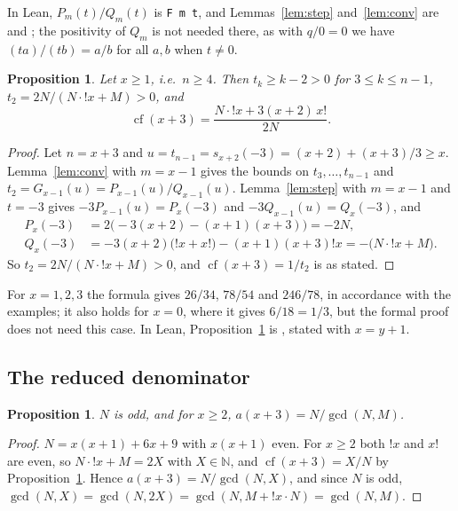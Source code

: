 \documentclass[11pt]{amsart}
\theoremstyle{plain}
\newtheorem{proposition}[theorem]{Proposition}
\theoremstyle{definition}
\newcommand{\N}{\mathbb{N}}
\newcommand{\lf}{\mathop{!}}
\DeclareMathOperator{\cf}{cf}
\begin{document}
In Lean, $P_m(t)/Q_m(t)$ is \texttt{F m t}, and Lemmas~\ref{lem:step} and~\ref{lem:conv} are  and ; the positivity of $Q_m$ is not needed there, as with $q/0=0$ we have $(ta)/(tb)=a/b$ for all $a,b$ when $t\ne0$.

\begin{proposition}\label{prop:closed}
Let $x\ge1$, i.e.\ $n\ge4$. Then $t_k\ge k-2>0$ for $3\le k\le n-1$, $t_2=2N/(N\cdot{\lf x}+M)>0$, and
\[
  \cf(x+3)=\frac{N\cdot\lf x+3(x+2)\,x!}{2N}.
\]
\end{proposition}

\begin{proof}
Let $n=x+3$ and $u=t_{n-1}=s_{x+2}(-3)=(x+2)+(x+3)/3\ge x$. Lemma~\ref{lem:conv} with $m=x-1$ gives the bounds on $t_3,\dots,t_{n-1}$ and $t_2=G_{x-1}(u)=P_{x-1}(u)/Q_{x-1}(u)$. Lemma~\ref{lem:step} with $m=x-1$ and $t=-3$ gives $-3P_{x-1}(u)=P_x(-3)$ and $-3Q_{x-1}(u)=Q_x(-3)$, and
\begin{align*}
  P_x(-3)&=2\bigl(-3(x+2)-(x+1)(x+3)\bigr)=-2N,\\
  Q_x(-3)&=-3(x+2)\bigl(\lf x+x!\bigr)-(x+1)(x+3)\lf x=-\bigl(N\cdot{\lf x}+M\bigr).
\end{align*}
So $t_2=2N/(N\cdot{\lf x}+M)>0$, and $\cf(x+3)=1/t_2$ is as stated.
\end{proof}

For $x=1,2,3$ the formula gives $26/34$, $78/54$ and $246/78$, in accordance with the examples; it also holds for $x=0$, where it gives $6/18=1/3$, but the formal proof does not need this case.
In Lean, Proposition~\ref{prop:closed} is , stated with $x=y+1$.

\subsection{The reduced denominator}

\begin{proposition}\label{prop:den}
$N$ is odd, and for $x\ge2$, $a(x+3)=N/\gcd(N,M)$.
\end{proposition}

\begin{proof}
$N=x(x+1)+6x+9$ with $x(x+1)$ even. For $x\ge2$ both $\lf x$ and $x!$ are even, so $N\cdot{\lf x}+M=2X$ with $X\in\N$, and $\cf(x+3)=X/N$ by Proposition~\ref{prop:closed}. Hence $a(x+3)=N/\gcd(N,X)$, and since $N$ is odd,
$\gcd(N,X)=\gcd(N,2X)=\gcd(N,M+\lf x\cdot N)=\gcd(N,M)$.
\end{proof}
\end{document}
